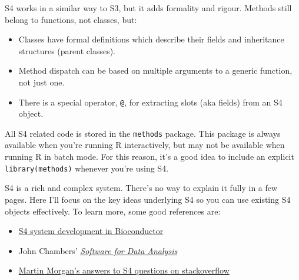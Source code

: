 \begin{enumerate}
\begin{Shaded}
\begin{Highlighting}[]
\StringTok{ }
\StringTok{ }


\StringTok{ }
\end{Highlighting}
\end{Shaded}
\end{enumerate}


S4 works in a similar way to S3, but it adds formality and rigour.
Methods still belong to functions, not classes, but:
 

\begin{itemize}
\item
  Classes have formal definitions which describe their fields and
  inheritance structures (parent classes).
\item
  Method dispatch can be based on multiple arguments to a generic
  function, not just one.
\item
  There is a special operator, \texttt{@}, for extracting slots (aka
  fields) from an S4 object.
\end{itemize}

All S4 related code is stored in the \texttt{methods} package. This
package is always available when you're running R interactively, but may
not be available when running R in batch mode. For this reason, it's a
good idea to include an explicit \texttt{library(methods)} whenever
you're using S4.

S4 is a rich and complex system. There's no way to explain it fully in a
few pages. Here I'll focus on the key ideas underlying S4 so you can use
existing S4 objects effectively. To learn more, some good references
are:

\begin{itemize}
\item
  \href{http://www.bioconductor.org/help/course-materials/2010/AdvancedR/S4InBioconductor.pdf}{S4
  system development in Bioconductor}
\item
  John Chambers'
  \href{http://amzn.com/0387759352?tag=devtools-20}{\emph{Software for
  Data Analysis}}
\item
  \href{http://stackoverflow.com/search?tab=votes\&q=user\%3a547331\%20\%5bs4\%5d\%20is\%3aanswe}{Martin
  Morgan's answers to S4 questions on stackoverflow}
\end{itemize}

